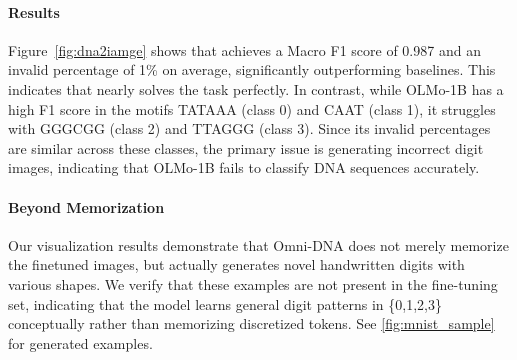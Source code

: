 \paragraph{Results} Figure~\ref{fig:dna2iamge} shows that \method achieves a Macro F1 score of 0.987 and an invalid percentage of 1\% on average, significantly outperforming baselines. This indicates that \method nearly solves the task perfectly. In contrast, while OLMo-1B has a high F1 score in the motifs TATAAA (class 0) and CAAT (class 1), it struggles with GGGCGG (class 2) and TTAGGG (class 3). Since its invalid percentages are similar across these classes, the primary issue is generating incorrect digit images, indicating that OLMo-1B fails to classify DNA sequences accurately.




\paragraph{Beyond Memorization} Our visualization results demonstrate that Omni-DNA does not merely memorize the finetuned images, but actually generates novel handwritten digits with various shapes. We verify that these examples are not present in the fine-tuning set, indicating that the model learns general digit patterns in \{0,1,2,3\} conceptually rather than memorizing discretized tokens. See \cref{fig:mnist_sample} for generated examples.




